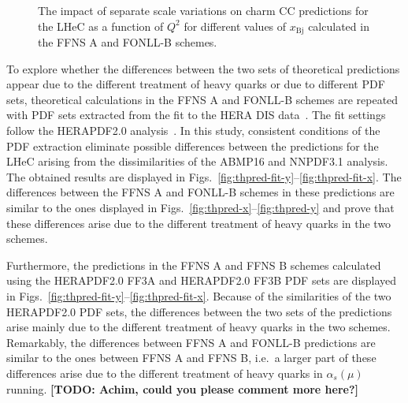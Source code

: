 \documentclass[pdftex,twocolumn,epjc3]{svjour3}          %
\newcommand{\abmp} {ABMP16\xspace}
\newcommand{\nnpdf} {NNPDF3.1\xspace}
\newcommand{\xbj}{\ensuremath{x_{\text{Bj}}}\xspace}
\newcommand{\fonll} {{FONLL-B}\xspace}
\newcommand{\ffns} {{FFNS A}\xspace}
\newcommand{\ffnsb} {{FFNS B}\xspace}
\newcommand{\ffthreea} {{HERAPDF2.0 FF3A}\xspace}
\newcommand{\ffthreeb} {{HERAPDF2.0 FF3B}\xspace}
\begin{document}
\begin{figure}
    \centering
    \caption{The impact of separate scale variations on charm CC predictions for the LHeC as a function of $Q^2$ for different values of \xbj calculated in the \ffns and \fonll schemes.}
    \label{fig:thpred-q2-varmu}
\end{figure}

To explore whether the differences between the two sets of theoretical predictions appear due to the different treatment of heavy quarks or due to different PDF sets, theoretical calculations in the \ffns and \fonll schemes are repeated with PDF sets extracted from the fit to the HERA DIS data~\cite{Abramowicz:2015mha}. The fit settings follow the HERAPDF2.0 analysis~\cite{Abramowicz:2015mha}. 
In this study, consistent conditions of the PDF extraction eliminate possible differences between the predictions for the LHeC arising from the dissimilarities of the \abmp and \nnpdf analysis. The obtained results are displayed in Figs.~\ref{fig:thpred-fit-y}--\ref{fig:thpred-fit-x}. The differences between the \ffns and \fonll schemes in these predictions are similar to the ones displayed in Figs.~\ref{fig:thpred-x}--\ref{fig:thpred-y} and prove that these differences arise due to the different treatment of heavy quarks in the two schemes.

Furthermore, the predictions in the \ffns and \ffnsb schemes calculated using the \ffthreea and \ffthreeb PDF sets are displayed in Figs.~\ref{fig:thpred-fit-y}--\ref{fig:thpred-fit-x}. Because of the similarities of the two HERAPDF2.0 PDF sets, the differences between the two sets of the predictions arise mainly due to the different treatment of heavy quarks in the two schemes. Remarkably, the differences between \ffns and \fonll predictions are similar to the ones between \ffns and \ffnsb, i.e.\ a larger part of these differences arise due to the different treatment of heavy quarks in $\alpha_s(\mu)$ running.
{\bf [TODO: Achim, could you please comment more here?]}
\end{document}

